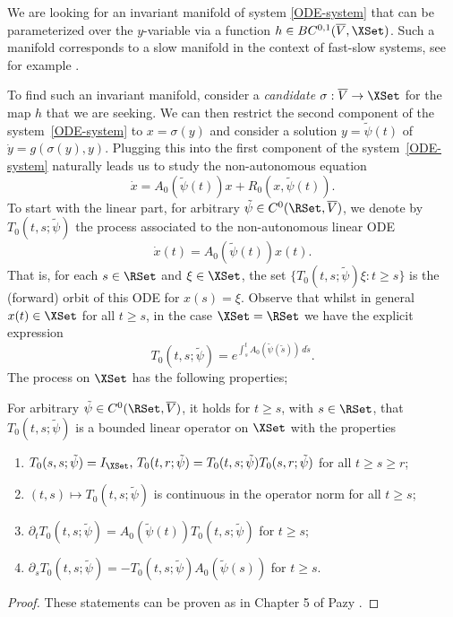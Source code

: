 \documentclass[a4paper]{siamart190516}
\begin{document}
We are looking for an invariant manifold of system \cref{ODE-system} that can be parameterized over the $y$-variable via a function $h \in BC^{0,1}(\overline{V},\XSet)$. Such a manifold corresponds to a slow manifold in the context of fast-slow systems, see for example \cite{He81, Sa90, El12}.

To find such an invariant manifold, consider a \emph{candidate} $\sigma:\overline{V}\to\XSet$ for the map $h$ that we are seeking. We can then restrict the second component of the system~\cref{ODE-system} to $x=\sigma(y)$ and consider a solution $y=\tilde{\psi}(t)$ of
$
   \dot{y}=g(\sigma(y),y).
$
Plugging this into the first component of the system~\cref{ODE-system} naturally leads us to study the non-autonomous equation
\[
   \dot{x}=A_0(\tilde{\psi}(t)) x + R_0(x,\tilde{\psi}(t)).
\]
To start with the linear part, 
for arbitrary $\tilde{\psi} \in C^0(\RSet,\overline{V})$, we denote by $T_0(t,s;\tilde{\psi})$ the process associated to the non-autonomous linear ODE
\[
\dot{x}(t) = A_0(\tilde{\psi}(t)) x(t).
\]
That is, for each  $s \in \RSet$ and $\xi \in \XSet$, the set $\{T_0(t,s; \tilde{\psi}) \xi : t \geq s \}$ is the (forward) orbit of this ODE for $x(s) = \xi$. Observe that whilst in general $x(t) \in \XSet$ for all $t \geq s$, in the case $\XSet = \RSet$ we have the explicit expression
\[
T_0(t,s; \tilde{\psi}) = e^{\int^t_s A_0(\tilde{\psi}(\tilde{s})) \, d\tilde{s}}.
\]
 The process on $\XSet$ has the following properties;
 \begin{lemma}\label{lem:process-props}
For arbitrary $\tilde{\psi} \in C^0(\RSet,\overline{V})$, it holds for $t \geq s$, with $s \in \RSet$, that $T_0(t,s; \tilde{\psi})$ is a bounded linear operator on $\XSet$ with the properties
 \begin{enumerate}
 \item $T_0(s,s; \tilde{\psi}) = I_{\XSet}, \, T_0(t,r; \tilde{\psi}) = T_0(t,s; \tilde{\psi}) T_0(s,r; \tilde{\psi})$ for all $t \geq s \geq r$;
 \item $(t,s) \mapsto T_0(t,s; \tilde{\psi})$ is continuous in the operator norm for all $t \geq s$;
 \item $\partial_t T_0(t,s; \tilde{\psi}) = A_0(\tilde{\psi}(t)) T_0(t,s; \tilde{\psi})$ for $t \geq s$;
 \item $\partial_s T_0(t,s; \tilde{\psi}) = -T_0(t,s; \tilde{\psi})A_0(\tilde{\psi}(s)) $ for $t \geq s$.
 \end{enumerate}
 \end{lemma}
 
\begin{proof}
These statements can be proven as in Chapter 5 of Pazy \cite{Pa83}. 
\end{proof}
\end{document}

